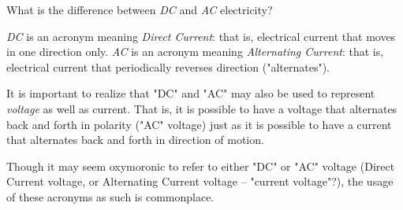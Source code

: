 

What is the difference between {\it DC} and {\it AC} electricity?







{\it DC} is an acronym meaning {\it Direct Current}: that is, electrical current that moves in one direction only.  {\it AC} is an acronym meaning {\it Alternating Current}: that is, electrical current that periodically reverses direction ("alternates").

It is important to realize that "DC" and "AC" may also be used to represent {\it voltage} as well as current.  That is, it is possible to have a voltage that alternates back and forth in polarity ("AC" voltage) just as it is possible to have a current that alternates back and forth in direction of motion.







Though it may seem oxymoronic to refer to either "DC" or "AC" voltage (Direct Current voltage, or Alternating Current voltage -- "current voltage"?), the usage of these acronyms as such is commonplace.




